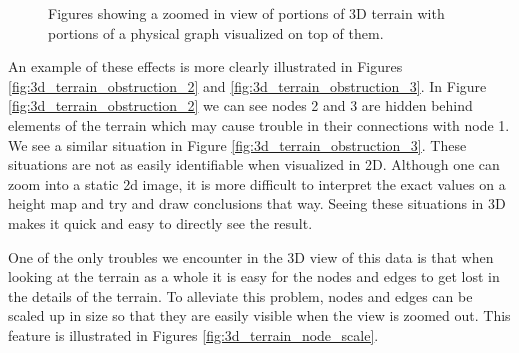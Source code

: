 \begin{figure}[ht]
{	\label{fig:3d_terrain_obstruction_2}
}
  \caption{Figures showing a zoomed in view of portions of 3D terrain with portions of a physical graph visualized on top of them.}
\label{fig:3d_terrain_closeups}
\end{figure}

An example of these effects is more clearly illustrated in Figures \ref{fig:3d_terrain_obstruction_2} and \ref{fig:3d_terrain_obstruction_3}.  In Figure \ref{fig:3d_terrain_obstruction_2} we can see nodes 2 and 3 are hidden behind elements of the terrain which may cause trouble in their connections with node 1.  We see a similar situation in Figure \ref{fig:3d_terrain_obstruction_3}.  These situations are not as easily identifiable when visualized in 2D.  Although one can zoom into a static 2d image, it is more difficult to interpret the exact values on a height map and try and draw conclusions that way.  Seeing these situations in 3D makes it quick and easy to directly see the result.

One of the only troubles we encounter in the 3D view of this data is that when looking at the terrain as a whole it is easy for the nodes and edges to get lost in the details of the terrain.  To alleviate this problem, nodes and edges can be scaled up in size so that they are easily visible when the view is zoomed out.  This feature is illustrated in Figures \ref{fig:3d_terrain_node_scale}.

